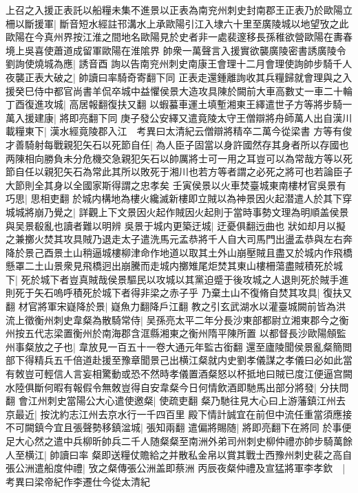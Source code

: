 上召之入援正表託以船糧未集不進景以正表為南兖州刺史封南郡王正表乃於歐陽立柵以斷援軍|{
	斷音短水經註邗溝水上承歐陽引江入埭六十里至廣陵城以地望攷之此歐陽在今真州界按江淮之間地名歐陽見於史者非一處裴邃移長孫稚欲營歐陽在夀春境上吳喜使蕭道成留軍歐陽在淮隂界}
帥衆一萬聲言入援實欲襲廣陵密書誘廣陵令劉詢使燒城為應|{
	誘音酉}
詢以告南兖州刺史南康王會理十二月會理使詢帥步騎千人夜襲正表大破之|{
	帥讀曰率騎奇寄翻下同}
正表走還鍾離詢收其兵糧歸就會理與之入援癸巳侍中都官尚書羊侃卒城中益懼侯景大造攻具陳於闕前大車高數丈一車二十輪丁酉復進攻城|{
	高居報翻復扶又翻}
以蝦蟇車運土填塹湘東王繹遣世子方等將步騎一萬入援建康|{
	將即亮翻下同}
庚子發公安繹又遣竟陵太守王僧辯將舟師萬人出自漢川載糧東下|{
	漢水經竟陵郡入江　考異曰太清紀云僧辯將精卒二萬今從梁書}
方等有俊才善騎射每戰親犯矢石以死節自任|{
	為人臣子固當以身許國然存其身者所以存國也两陳相向勝負未分危機交急親犯矢石以帥厲將士可一用之耳豈可以為常哉方等以死節自任以親犯矢石為常此其所以敗死于湘川也若方等者謂之必死之將可也若論臣子大節則全其身以全國家斯得謂之忠孝矣}
壬寅侯景以火車焚臺城東南樓材官吳景有巧思|{
	思相吏翻}
於城内構地為樓火纔滅新樓即立賊以為神景因火起潜遣人於其下穿城城將崩乃覺之|{
	詳觀上下文景因火起作賊因火起則于當時事勢文理為明順盖侯景與吴景殽亂也讀者難以明辨}
吳景于城内更築迂城|{
	迂憂俱翻迃曲也}
狀如却月以擬之兼擲火焚其攻具賊乃退走太子遣洗馬元孟恭將千人自大司馬門出盪孟恭與左右奔降於景己酉景土山稍逼城樓柳津命作地道以取其土外山崩壓賊且盡又於城内作飛橋懸罩二土山景衆見飛橋迥出崩騰而走城内擲雉尾炬焚其東山樓柵蕩盡賊積死於城下|{
	死於城下者豈真賊哉侯景驅民以攻城以其黨迫蹙于後攻城之人退則死於賊手進則死于矢石嗚呼積死於城下者得非梁之赤子乎}
乃棄土山不復脩自焚其攻具|{
	復扶又翻}
材官將軍宋嶷降於景|{
	嶷魚力翻降戶江翻}
教之引玄武湖水以灌臺城闕前皆為洪流上徵衡州刺史韋粲為散騎常侍|{
	吴孫亮太平二年分長沙東部都尉立湘東郡今之衡州按五代志梁置衡州於南海郡含洭縣湘東之衡州隋平陳所置}
以都督長沙歐陽頠監州事粲放之子也|{
	韋放見一百五十一卷大通元年監古銜翻}
還至廬陵聞侯景亂粲簡閲部下得精兵五千倍道赴援至豫章聞景己出横江粲就内史劉孝儀謀之孝儀曰必如此當有敇豈可輕信人言妄相驚動或恐不然時孝儀置酒粲怒以杯抵地曰賊已度江便逼宫闕水陸俱斷何暇有報假令無敇豈得自安韋粲今日何情飲酒即馳馬出部分將發|{
	分扶問翻}
會江州刺史當陽公大心遣使邀粲|{
	使疏吏翻}
粲乃馳往見大心曰上游藩鎮江州去京最近|{
	按沈約志江州去京水行一千四百里}
殿下情計誠宜在前但中流任重當須應接不可闕鎮今宜且張聲勢移鎮湓城|{
	張知兩翻}
遣偏將賜随|{
	將即亮翻下在將同}
於事便足大心然之遣中兵柳昕帥兵二千人随粲粲至南洲外弟司州刺史柳仲禮亦帥步騎萬餘人至横江|{
	帥讀曰率}
粲即送糧仗贍給之并散私金帛以賞其戰士西豫州刺史裴之高自張公洲遣船度仲禮|{
	攷之粲傳張公洲盖即蔡洲}
丙辰夜粲仲禮及宣猛將軍李孝欽　|{
	考異曰梁帝紀作李遷仕今從太清紀}
